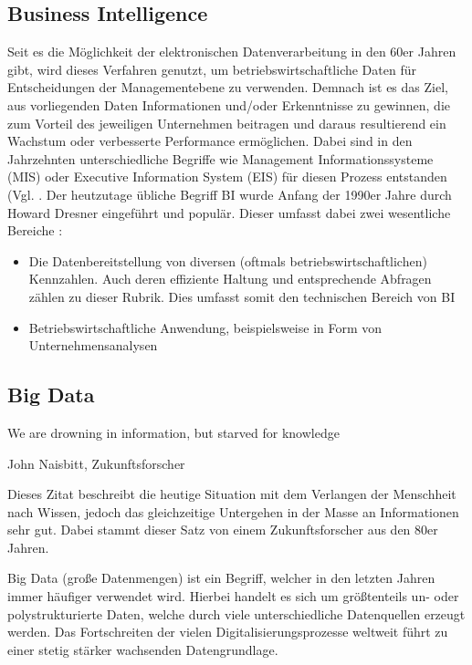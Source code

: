 \subsection{Business Intelligence}
\label{sub:bi}
Seit es die Möglichkeit der elektronischen Datenverarbeitung in den 60er Jahren gibt, wird dieses Verfahren genutzt, um betriebswirtschaftliche Daten für Entscheidungen der Managementebene zu verwenden.
Demnach ist es das Ziel, aus vorliegenden Daten Informationen und/oder Erkenntnisse zu gewinnen, die zum Vorteil des jeweiligen Unternehmen beitragen und daraus resultierend ein Wachstum oder verbesserte Performance ermöglichen.
Dabei sind in den Jahrzehnten unterschiedliche Begriffe wie \glqq Management Informationssysteme (MIS)\grqq{} oder \glqq Executive Information System (EIS)\grqq{} für diesen Prozess entstanden (Vgl. \cite[S.3]{Engels.2015}.
Der heutzutage übliche Begriff \acrfull{BI} wurde Anfang der 1990er Jahre durch Howard Dresner eingeführt und populär.
Dieser umfasst dabei zwei wesentliche Bereiche \cite{Kemper.2004}:
\begin{itemize}
\item Die Datenbereitstellung von diversen (oftmals betriebswirtschaftlichen) Kennzahlen. 
Auch deren effiziente Haltung und entsprechende Abfragen zählen zu dieser Rubrik.
Dies umfasst somit den technischen Bereich von \gls{BI}
\item Betriebswirtschaftliche Anwendung, beispielsweise in Form von Unternehmensanalysen 
\end{itemize}

\subsection{Big Data}
\label{sub:bigdata}
\epigraph{\glqq We are drowning in information, but starved for knowledge\grqq}{John Naisbitt, Zukunftsforscher \cite{Naisbitt.1982}}
Dieses Zitat beschreibt die heutige Situation mit dem Verlangen der Menschheit nach Wissen, jedoch das gleichzeitige Untergehen in der Masse an Informationen sehr gut. 
Dabei stammt dieser Satz von einem Zukunftsforscher aus den 80er Jahren.

Big Data (\glqq große Datenmengen\grqq) ist ein Begriff, welcher in den letzten Jahren immer häufiger verwendet wird.
Hierbei handelt es sich um größtenteils un- oder polystrukturierte Daten, welche durch viele unterschiedliche Datenquellen erzeugt werden.
Das Fortschreiten der vielen Digitalisierungsprozesse weltweit führt zu einer stetig stärker wachsenden Datengrundlage. 


